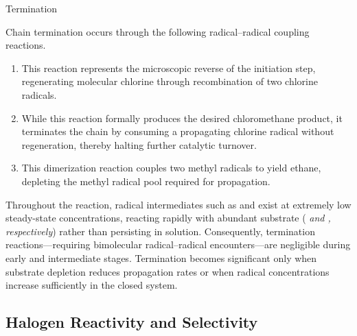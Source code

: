 \documentclass[10pt]{article}
\begin{document}
    \begin{core}{Termination}

      Chain termination occurs through the following radical--radical coupling reactions.

      \begin{enumerate}

        \item {}
        
        This reaction represents the microscopic reverse of the initiation step, regenerating molecular chlorine through recombination of two chlorine radicals.

        \item {}
        
        While this reaction formally produces the desired chloromethane product, it terminates the chain by consuming a propagating chlorine radical without regeneration, thereby halting further catalytic turnover.

        \item {}
        
        This dimerization reaction couples two methyl radicals to yield ethane, depleting the methyl radical pool required for propagation.

      \end{enumerate}

      Throughout the reaction, radical intermediates such as  and  exist at extremely low steady-state concentrations, reacting rapidly with abundant substrate (\textit{ and , respectively}) rather than persisting in solution. Consequently, termination reactions---requiring bimolecular radical--radical encounters---are negligible during early and intermediate stages. Termination becomes significant only when substrate depletion reduces propagation rates or when radical concentrations increase sufficiently in the closed system.

    \end{core}

  \subsection{Halogen Reactivity and Selectivity}
\end{document}
